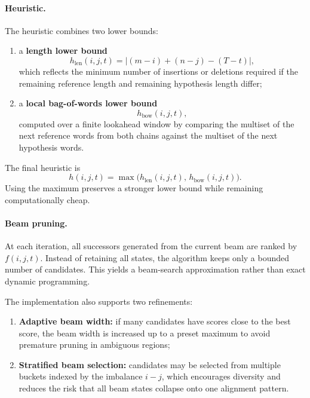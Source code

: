 \paragraph{Heuristic.}
The heuristic combines two lower bounds:
\begin{enumerate}
    \item a \textbf{length lower bound}
    \begin{equation}
    h_{\mathrm{len}}(i,j,t) = \left| (m-i)+(n-j) - (T-t) \right|,
    \end{equation}
    which reflects the minimum number of insertions or deletions required if the remaining reference length and remaining hypothesis length differ;

    \item a \textbf{local bag-of-words lower bound}
    \begin{equation}
    h_{\mathrm{bow}}(i,j,t),
    \end{equation}
    computed over a finite lookahead window by comparing the multiset of the next reference words from both chains against the multiset of the next hypothesis words.
\end{enumerate}
The final heuristic is
\begin{equation}
h(i,j,t) = \max\!\bigl(h_{\mathrm{len}}(i,j,t),\, h_{\mathrm{bow}}(i,j,t)\bigr).
\end{equation}
Using the maximum preserves a stronger lower bound while remaining computationally cheap.

\paragraph{Beam pruning.}
At each iteration, all successors generated from the current beam are ranked by \(f(i,j,t)\). Instead of retaining all states, the algorithm keeps only a bounded number of candidates. This yields a beam-search approximation rather than exact dynamic programming.

The implementation also supports two refinements:
\begin{enumerate}
    \item \textbf{Adaptive beam width:} if many candidates have scores close to the best score, the beam width is increased up to a preset maximum to avoid premature pruning in ambiguous regions;
    \item \textbf{Stratified beam selection:} candidates may be selected from multiple buckets indexed by the imbalance \(i-j\), which encourages diversity and reduces the risk that all beam states collapse onto one alignment pattern.
\end{enumerate}

